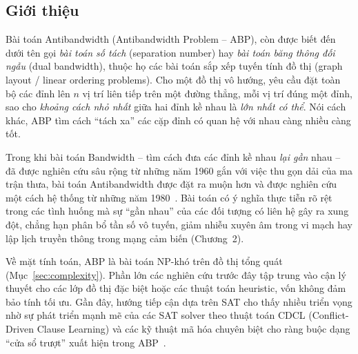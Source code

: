 \documentclass[a4paper,fleqn]{cas-sc}
\begin{document}
\subsection{Giới thiệu}
\label{sec:intro}
Bài toán Antibandwidth (Antibandwidth Problem -- ABP), còn được biết đến dưới tên gọi \emph{bài toán số tách} (separation number) hay \emph{bài toán băng thông đối ngẫu} (dual bandwidth), thuộc họ các bài toán sắp xếp tuyến tính đồ thị (graph layout / linear ordering problems). Cho một đồ thị vô hướng, yêu cầu đặt toàn bộ các đỉnh lên $n$ vị trí liên tiếp trên một đường thẳng, mỗi vị trí đúng một đỉnh, sao cho \emph{khoảng cách nhỏ nhất} giữa hai đỉnh kề nhau là \emph{lớn nhất có thể}. Nói cách khác, ABP tìm cách ``tách xa'' các cặp đỉnh có quan hệ với nhau càng nhiều càng tốt.

Trong khi bài toán Bandwidth -- tìm cách đưa các đỉnh kề nhau \emph{lại gần} nhau -- đã được nghiên cứu sâu rộng từ những năm 1960 gắn với việc thu gọn dải của ma trận thưa, bài toán Antibandwidth được đặt ra muộn hơn và được nghiên cứu một cách hệ thống từ những năm 1980~\cite{leung1984,miller1989}. Bài toán có ý nghĩa thực tiễn rõ rệt trong các tình huống mà sự ``gần nhau'' của các đối tượng có liên hệ gây ra xung đột, chẳng hạn phân bổ tần số vô tuyến, giảm nhiễu xuyên âm trong vi mạch hay lập lịch truyền thông trong mạng cảm biến (Chương~2).

Về mặt tính toán, ABP là bài toán NP-khó trên đồ thị tổng quát (Mục~\ref{sec:complexity}). Phần lớn các nghiên cứu trước đây tập trung vào cận lý thuyết cho các lớp đồ thị đặc biệt hoặc các thuật toán heuristic, vốn không đảm bảo tính tối ưu. Gần đây, hướng tiếp cận dựa trên SAT cho thấy nhiều triển vọng nhờ sự phát triển mạnh mẽ của các SAT solver theo thuật toán CDCL (Conflict-Driven Clause Learning) và các kỹ thuật mã hóa chuyên biệt cho ràng buộc dạng ``cửa sổ trượt'' xuất hiện trong ABP~\cite{truong2025}.
\end{document}
